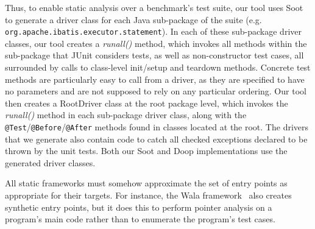 Thus, to enable static analysis over a benchmark's test suite, our tool uses Soot to generate a driver class for each Java sub-package of the suite (e.g. \texttt{org.apache.ibatis.executor.statement}). In each of these sub-package driver classes, our tool creates a \textit{runall()} method, which invokes all methods within the sub-package that JUnit considers tests, as well as non-constructor test cases, all surrounded by calls to class-level init/setup and teardown methods. Concrete test methods are particularly easy to call from a driver, as they are specified to have no parameters and are not supposed to rely on any particular ordering. 
Our tool then creates a RootDriver class at the root package level, which invokes the \textit{runall()} method in each sub-package driver class, along with the \texttt{@Test}/\texttt{@Before}/\texttt{@After} methods found in classes located at the root. The drivers that we generate also contain code to catch all checked exceptions declared to be thrown by the unit tests. Both our Soot and Doop implementations use the generated driver classes.

All static frameworks must somehow approximate the set of entry points as appropriate for their targets. For instance, the Wala framework~\cite{wala19:_t} also creates synthetic entry points, but it does this to perform pointer analysis on a program's main code rather than to enumerate the program's test cases.



